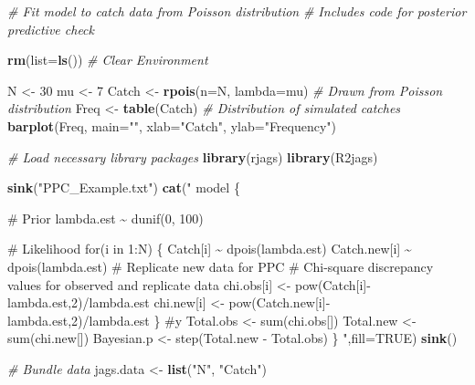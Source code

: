 \documentclass[
]{krantz}
\makeatletter
\newenvironment{Shaded}{\begin{snugshade}}{\end{snugshade}}
\newcommand{\AttributeTok}[1]{\textcolor[rgb]{0.27,0.27,0.27}{#1}}
\newcommand{\CommentTok}[1]{\textcolor[rgb]{0.37,0.37,0.37}{\textit{#1}}}
\newcommand{\ConstantTok}[1]{\textcolor[rgb]{0.37,0.37,0.37}{#1}}
\newcommand{\DecValTok}[1]{\textcolor[rgb]{0.06,0.06,0.06}{#1}}
\newcommand{\FunctionTok}[1]{\textcolor[rgb]{0.27,0.27,0.27}{\textbf{#1}}}
\newcommand{\NormalTok}[1]{#1}
\newcommand{\OtherTok}[1]{\textcolor[rgb]{0.37,0.37,0.37}{#1}}
\newcommand{\StringTok}[1]{\textcolor[rgb]{0.5,0.5,0.5}{#1}}
\newenvironment{kframe}{%
\medskip{}
\setlength{\fboxsep}{.8em}
 \def\at@end@of@kframe{}%
 \ifinner\ifhmode%
  \def\at@end@of@kframe{\end{minipage}}%
  \begin{minipage}{\columnwidth}%
 \fi\fi%
 \def\FrameCommand##1{\hskip\@totalleftmargin \hskip-\fboxsep
 \colorbox{shadecolor}{##1}\hskip-\fboxsep
     \hskip-\linewidth \hskip-\@totalleftmargin \hskip\columnwidth}%
 \MakeFramed {\advance\hsize-\width
   \@totalleftmargin\z@ \linewidth\hsize
   \@setminipage}}%
 {\par\unskip\endMakeFramed%
 \at@end@of@kframe}
\renewenvironment{Shaded}{\begin{kframe}}{\end{kframe}}
\makeatother
\begin{document}
\begin{Shaded}
\begin{Highlighting}[]
\CommentTok{\# Fit model to catch data from Poisson distribution}
\CommentTok{\# Includes code for posterior predictive check}

\FunctionTok{rm}\NormalTok{(}\AttributeTok{list=}\FunctionTok{ls}\NormalTok{()) }\CommentTok{\# Clear Environment}

\NormalTok{N }\OtherTok{\textless{}{-}} \DecValTok{30}
\NormalTok{mu }\OtherTok{\textless{}{-}} \DecValTok{7}
\NormalTok{Catch }\OtherTok{\textless{}{-}} \FunctionTok{rpois}\NormalTok{(}\AttributeTok{n=}\NormalTok{N, }\AttributeTok{lambda=}\NormalTok{mu) }\CommentTok{\# Drawn from Poisson distribution}
\NormalTok{Freq }\OtherTok{\textless{}{-}} \FunctionTok{table}\NormalTok{(Catch)  }\CommentTok{\# Distribution of simulated catches}
\FunctionTok{barplot}\NormalTok{(Freq, }\AttributeTok{main=}\StringTok{""}\NormalTok{, }\AttributeTok{xlab=}\StringTok{"Catch"}\NormalTok{, }\AttributeTok{ylab=}\StringTok{"Frequency"}\NormalTok{)}

\CommentTok{\# Load necessary library packages}
\FunctionTok{library}\NormalTok{(rjags)}
\FunctionTok{library}\NormalTok{(R2jags)}

\FunctionTok{sink}\NormalTok{(}\StringTok{"PPC\_Example.txt"}\NormalTok{)}
\FunctionTok{cat}\NormalTok{(}\StringTok{"}
\StringTok{model \{}

\StringTok{\# Prior}
\StringTok{ lambda.est \textasciitilde{} dunif(0, 100)}

\StringTok{\# Likelihood}
\StringTok{    for(i in 1:N) \{}
\StringTok{      Catch[i] \textasciitilde{} dpois(lambda.est)}
\StringTok{      Catch.new[i] \textasciitilde{} dpois(lambda.est) \# Replicate new data for PPC}
\StringTok{      \# Chi{-}square discrepancy values for observed and replicate data}
\StringTok{      chi.obs[i] \textless{}{-} pow(Catch[i]{-}lambda.est,2)/lambda.est}
\StringTok{      chi.new[i] \textless{}{-} pow(Catch.new[i]{-}lambda.est,2)/lambda.est}
\StringTok{      \} \#y}
\StringTok{  Total.obs \textless{}{-} sum(chi.obs[])}
\StringTok{  Total.new \textless{}{-} sum(chi.new[])}
\StringTok{  Bayesian.p \textless{}{-} step(Total.new {-} Total.obs)}
\StringTok{\}}
\StringTok{    "}\NormalTok{,}\AttributeTok{fill=}\ConstantTok{TRUE}\NormalTok{)}
\FunctionTok{sink}\NormalTok{()}

\CommentTok{\# Bundle data}
\NormalTok{jags.data }\OtherTok{\textless{}{-}} \FunctionTok{list}\NormalTok{(}\StringTok{"N"}\NormalTok{, }\StringTok{"Catch"}\NormalTok{)}


\end{Highlighting}
\end{Shaded}
\end{document}
